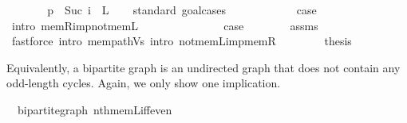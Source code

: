 \begin{isabellebody}
\ \ \isamarkupfalse%
\ \isamarkupfalse%
\ {\isachardoublequoteopen}{\isachardot}{\kern0pt}{\isachardot}{\kern0pt}{\isachardot}{\kern0pt}\ {\isasymlongleftrightarrow}\ p\ {\isacharbang}{\kern0pt}\ {\isacharparenleft}{\kern0pt}Suc\ i{\isacharparenright}{\kern0pt}\ {\isasymnotin}\ L{\isachardoublequoteclose}\isanewline
\ \ \isamarkupfalse%
\ {\isacharparenleft}{\kern0pt}standard{\isacharcomma}{\kern0pt}\ goal{\isacharunderscore}{\kern0pt}cases{\isacharparenright}{\kern0pt}\isanewline
\ \ \ \ \isamarkupfalse%
\ {}\isanewline
\ \ \ \ \isamarkupfalse%
\ {\isacharquery}{\kern0pt}case\isanewline
\ \ \ \ \ \ \isamarkupfalse%
\ {\isacharparenleft}{\kern0pt}intro\ mem{\isacharunderscore}{\kern0pt}R{\isacharunderscore}{\kern0pt}imp{\isacharunderscore}{\kern0pt}not{\isacharunderscore}{\kern0pt}mem{\isacharunderscore}{\kern0pt}L{\isacharparenright}{\kern0pt}\isanewline
\ \ \isamarkupfalse%
\isanewline
\ \ \ \ \isamarkupfalse%
\ {}\isanewline
\ \ \ \ \isamarkupfalse%
\ {\isacharquery}{\kern0pt}case\isanewline
\ \ \ \ \ \ \isamarkupfalse%
\ assms\isanewline
\ \ \ \ \ \ \isamarkupfalse%
\ {\isacharparenleft}{\kern0pt}fastforce\ intro{\isacharcolon}{\kern0pt}\ mem{\isacharunderscore}{\kern0pt}path{\isacharunderscore}{\kern0pt}Vs\ intro{\isacharcolon}{\kern0pt}\ not{\isacharunderscore}{\kern0pt}mem{\isacharunderscore}{\kern0pt}L{\isacharunderscore}{\kern0pt}imp{\isacharunderscore}{\kern0pt}mem{\isacharunderscore}{\kern0pt}R{\isacharparenright}{\kern0pt}\isanewline
\ \ \isamarkupfalse%
\isanewline
\ \ \isamarkupfalse%
\ \isamarkupfalse%
\ {\isacharquery}{\kern0pt}thesis\isanewline
\ \ \ \ \isacommand{{\isachardot}{\kern0pt}}\isamarkupfalse%
\isanewline
{}\isamarkupfalse%
%
\endisatagproof
{\isafoldproof}%
%
\isadelimproof
%
\endisadelimproof
%
\begin{isamarkuptext}%
Equivalently, a bipartite graph is an undirected graph that does not contain any odd-length cycles.
Again, we only show one implication.%
\end{isamarkuptext}\isamarkuptrue%
\isamarkupfalse%
\ {\isacharparenleft}{\kern0pt}\ bipartite{\isacharunderscore}{\kern0pt}graph{\isacharparenright}{\kern0pt}\ nth{\isacharunderscore}{\kern0pt}mem{\isacharunderscore}{\kern0pt}L{\isacharunderscore}{\kern0pt}iff{\isacharunderscore}{\kern0pt}even{\isacharcolon}{\kern0pt}\isanewline

\end{isabellebody}
